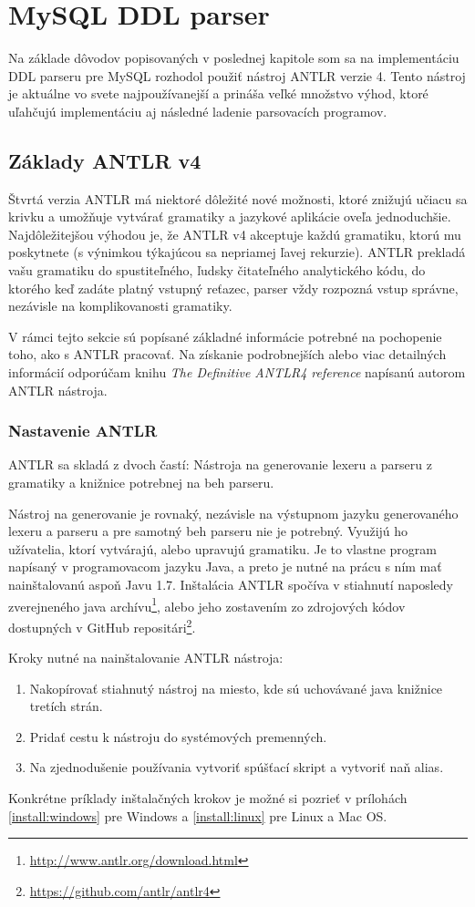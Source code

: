 \chapter{MySQL DDL parser}
Na základe dôvodov popisovaných v poslednej kapitole som sa na implementáciu DDL parseru pre MySQL rozhodol použiť nástroj ANTLR verzie 4. Tento nástroj je aktuálne vo svete najpoužívanejší a prináša veľké množstvo výhod, ktoré uľahčujú implementáciu aj následné ladenie parsovacích programov.

\section{Základy ANTLR v4}

Štvrtá verzia ANTLR má niektoré dôležité nové možnosti, ktoré znižujú učiacu sa krivku a umožňuje vytvárať gramatiky a jazykové aplikácie oveľa jednoduchšie. Najdôležitejšou výhodou je, že ANTLR v4 akceptuje každú gramatiku, ktorú mu poskytnete (s výnimkou týkajúcou sa nepriamej ľavej rekurzie). ANTLR prekladá vašu gramatiku do spustiteľného, ľudsky čitateľného analytického kódu, do ktorého keď zadáte platný vstupný reťazec, parser vždy rozpozná vstup správne, nezávisle na komplikovanosti gramatiky.

V rámci tejto sekcie sú popísané základné informácie potrebné na pochopenie toho, ako s ANTLR pracovať. Na získanie podrobnejších alebo viac detailných informácií odporúčam knihu \textit{The Definitive ANTLR4 reference}\cite{definitiveANTLR} napísanú autorom ANTLR nástroja.

\subsection{Nastavenie ANTLR}
ANTLR sa skladá z dvoch častí: Nástroja na generovanie lexeru a parseru z gramatiky a knižnice potrebnej na beh parseru.

Nástroj na generovanie je rovnaký, nezávisle na výstupnom jazyku generovaného lexeru a parseru a pre samotný beh parseru nie je potrebný. Využijú ho užívatelia, ktorí vytvárajú, alebo upravujú gramatiku. Je to vlastne program napísaný v programovacom jazyku Java, a preto je nutné na prácu s ním mať nainštalovanú aspoň Javu 1.7. Inštalácia ANTLR spočíva v stiahnutí naposledy zverejneného java archívu\footnote{\url{http://www.antlr.org/download.html}}, alebo jeho zostavením zo zdrojových kódov dostupných v GitHub repositári\footnote{\url{https://github.com/antlr/antlr4}}. 

Kroky nutné na nainštalovanie ANTLR nástroja:
\begin{enumerate}
\item Nakopírovať stiahnutý nástroj na miesto, kde sú uchovávané java knižnice tretích strán.
\item Pridať cestu k nástroju do systémových premenných.
\item Na zjednodušenie používania vytvoriť spúšťací skript a vytvoriť naň alias.
\end{enumerate}
Konkrétne príklady inštalačných krokov je možné si pozrieť v prílohách \ref{install:windows} pre Windows a \ref{install:linux} pre Linux a Mac OS.


